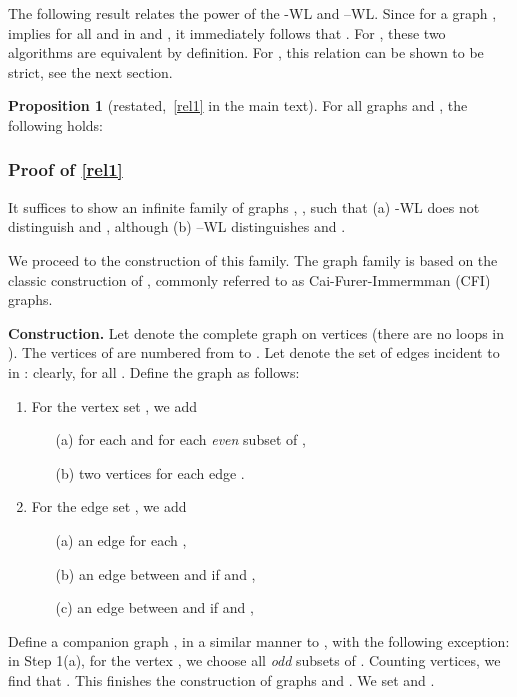 \documentclass{article}
\newcommand{\xhdr}[1]{{\noindent\bfseries #1}}
\theoremstyle{definition}
\newtheorem{proposition}[theorem]{Proposition}
\newcommand{\kwl}{-\textsf{WL}\xspace}
\newcommand{\deltakwl}{--\textsf{WL}\xspace}
\begin{document}
The following result relates the power of the \kwl and \deltakwl. Since for a graph ,   implies   for all  and  in  and , it immediately follows that . 
For , these two algorithms are equivalent by definition. For , this relation can be shown to be strict, see the next section.


\begin{proposition}[restated,~\cref{rel1} in the main text]\label{app:rel1} For all graphs and , the following holds: 	
\end{proposition}

\subsubsection{Proof of \cref{rel1}}\label{proofrel1}

It suffices to show an infinite family of graphs , , such that (a) \kwl does not distinguish  and , although (b) 
\deltakwl distinguishes  and . 

We proceed to the construction of this family. The graph family is based on the classic construction of \cite{Cai+1992}, commonly referred to as Cai-Furer-Immermman (CFI) graphs. 

\xhdr{Construction.} Let  denote the complete graph on  vertices (there are no loops in ). The vertices of  are numbered from  to . Let  denote the set of edges incident to  in : clearly,  for all . Define the graph  as follows:
\begin{enumerate}
	\item For the vertex set , we add   
	\begin{enumerate}
		\item[(a)]  for each  and for each \emph{even} subset  of , 
		\item[(b)] two vertices  for each edge .  
	\end{enumerate} 
	\item For the edge set , we add 
	\begin{enumerate}
		\item[(a)] an edge  for each , 
		\item[(b)] an edge between  and  if  and ,  
		\item[(c)] an edge between  and  if  and ,  
	\end{enumerate} 
\end{enumerate} 
Define a companion graph , in a similar manner to , with the following exception: in Step 1(a), for the vertex , we choose all \emph{odd} subsets of . Counting vertices, we find that . This finishes the construction of graphs  and . We set  and . 
\end{document}
